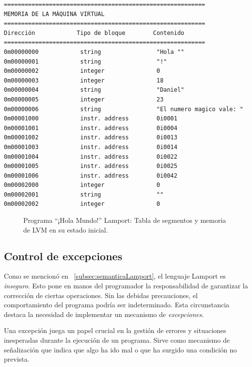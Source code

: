 \begin{verbatim}
==========================================================
MEMORIA DE LA MÁQUINA VIRTUAL
==========================================================
Dirección            Tipo de bloque        Contenido             
==========================================================
0m00000000            string                "Hola ""             
0m00000001            string                "!"                 
0m00000002            integer               0                     
0m00000003            integer               18                    
0m00000004            string                "Daniel"            
0m00000005            integer               23                    
0m00000006            string                "El numero magico vale: "
0m00001000            instr. address        0i0001                
0m00001001            instr. address        0i0004                
0m00001002            instr. address        0i0013                
0m00001003            instr. address        0i0014                
0m00001004            instr. address        0i0022                
0m00001005            instr. address        0i0025                
0m00001006            instr. address        0i0042                
0m00002000            integer               0                     
0m00002001            string                ""                    
0m00002002            integer               0                     
\end{verbatim}
\begin{figure}[hbtp]
\caption{Programa ``¡Hola Mundo!'' Lamport: Tabla de segmentos y memoria de LVM en su estado inicial.}
\label{fig:preLVMHolaMundo}
\end{figure}

\subsection{Control de excepciones}
Como se mencionó en ~\ref{subsec:semanticaLamport}, el lenguaje Lamport es \textit{inseguro}. Esto pone en manos del programador la responsabilidad de garantizar la corrección de ciertas operaciones. Sin las debidas precauciones, el comportamiento del programa podría ser indeterminado. Esta circunstancia destaca la necesidad de implementar un mecanismo de \textit{excepciones}.


Una excepción juega un papel crucial en la gestión de errores y situaciones inesperadas durante la ejecución de un programa. Sirve como mecanismo de señalización que indica que algo ha ido mal o que ha surgido una condición no prevista.


